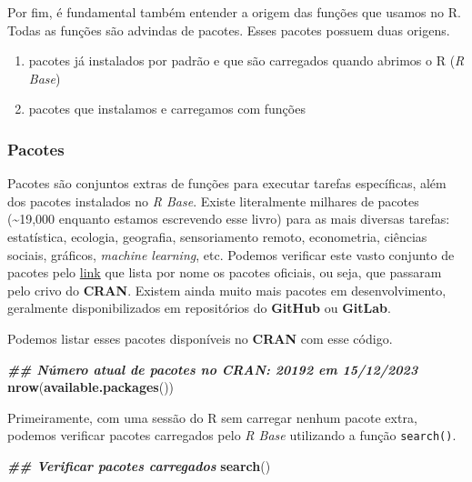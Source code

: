 \documentclass[
]{article}
\newenvironment{Shaded}{\begin{snugshade}}{\end{snugshade}}
\newcommand{\DocumentationTok}[1]{\textcolor[rgb]{0.56,0.35,0.01}{\textbf{\textit{#1}}}}
\newcommand{\FunctionTok}[1]{\textcolor[rgb]{0.13,0.29,0.53}{\textbf{#1}}}
\newcommand{\NormalTok}[1]{#1}
\providecommand{\tightlist}{%
  \setlength{\itemsep}{0pt}\setlength{\parskip}{0pt}}
\begin{document}
Por fim, é fundamental também entender a origem das funções que usamos no R. Todas as funções são advindas de pacotes. Esses pacotes possuem duas origens.

\begin{enumerate}
\def\labelenumi{\arabic{enumi}.}
\tightlist
\item
  pacotes já instalados por padrão e que são carregados quando abrimos o R (\emph{R Base})
\item
  pacotes que instalamos e carregamos com funções
\end{enumerate}

\hypertarget{pacotes-3}{%
\subsubsection{Pacotes}\label{pacotes-3}}

Pacotes são conjuntos extras de funções para executar tarefas específicas, além dos pacotes instalados no \emph{R Base}. Existe literalmente milhares de pacotes (\textasciitilde19,000 enquanto estamos escrevendo esse livro) para as mais diversas tarefas: estatística, ecologia, geografia, sensoriamento remoto, econometria, ciências sociais, gráficos, \emph{machine learning}, etc. Podemos verificar este vasto conjunto de pacotes pelo \href{https://cran.r-project.org/web/packages/available_packages_by_name.html}{link} que lista por nome os pacotes oficiais, ou seja, que passaram pelo crivo do \textbf{CRAN}. Existem ainda muito mais pacotes em desenvolvimento, geralmente disponibilizados em repositórios do \textbf{GitHub} ou \textbf{GitLab}.

Podemos listar esses pacotes disponíveis no \textbf{CRAN} com esse código.

\begin{Shaded}
\begin{Highlighting}[]
\DocumentationTok{\#\# Número atual de pacotes no CRAN: 20192 em 15/12/2023}
\FunctionTok{nrow}\NormalTok{(}\FunctionTok{available.packages}\NormalTok{())}
\end{Highlighting}
\end{Shaded}

Primeiramente, com uma sessão do R sem carregar nenhum pacote extra, podemos verificar pacotes carregados pelo \emph{R Base} utilizando a função \texttt{search()}.

\begin{Shaded}
\begin{Highlighting}[]
\DocumentationTok{\#\# Verificar pacotes carregados}
\FunctionTok{search}\NormalTok{()}
\end{Highlighting}
\end{Shaded}
\end{document}
